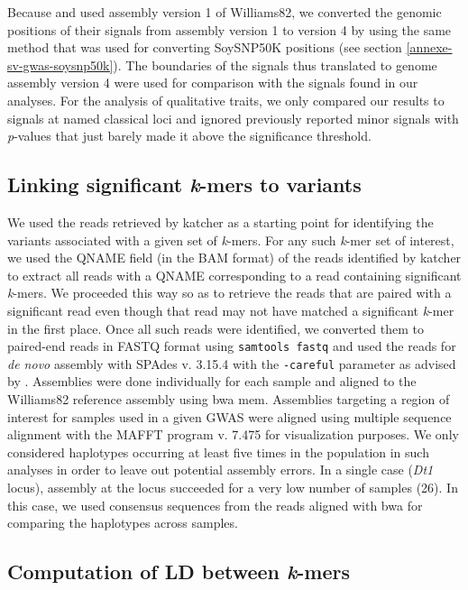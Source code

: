 Because \cite{bandillo2015} and \cite{bandillo2017} used assembly version 1 of
Williams82, we converted the genomic positions of their signals from assembly
version 1 to version 4 by using the same method that was used for converting
SoySNP50K positions (see section \ref{annexe-sv-gwas-soysnp50k}).  The
boundaries of the signals thus translated to genome assembly version 4 were
used for comparison with the signals found in our analyses. For the analysis of
qualitative traits, we only compared our results to signals at named classical
loci and ignored previously reported minor signals with \emph{p}-values that
just barely made it above the significance threshold.

\subsection{Linking significant \emph{k}-mers to variants}
\label{sv-gwas-methods-linking-kmers}

We used the reads retrieved by katcher as a starting point for identifying the
variants associated with a given set of \emph{k}-mers. For any such
\emph{k}-mer set of interest, we used the QNAME field (in the BAM format) of
the reads identified by katcher to extract all reads with a QNAME corresponding
to a read containing significant \emph{k}-mers. We proceeded this way so as to
retrieve the reads that are paired with a significant read even though that
read may not have matched a significant \emph{k}-mer in the first place. Once
all such reads were identified, we converted them to paired-end reads in FASTQ
format using \texttt{samtools fastq} and used the reads for \emph{de novo}
assembly with SPAdes v. 3.15.4 \citep{spades} with the \texttt{-\-careful}
parameter as advised by \cite{voichek2020}. Assemblies were done individually
for each sample and aligned to the Williams82 reference assembly using bwa mem.
Assemblies targeting a region of interest for samples used in a given GWAS were
aligned using multiple sequence alignment with the MAFFT program v. 7.475
\citep{katoh2002} for visualization purposes. We only considered haplotypes
occurring at least five times in the population in such analyses in order to
leave out potential assembly errors. In a single case (\emph{Dt1} locus),
assembly at the locus succeeded for a very low number of samples (26). In this
case, we used consensus sequences from the reads aligned with bwa for comparing
the haplotypes across samples.

\subsection{Computation of LD between \emph{k}-mers}
\label{sv-gwas-ld-kmers}


